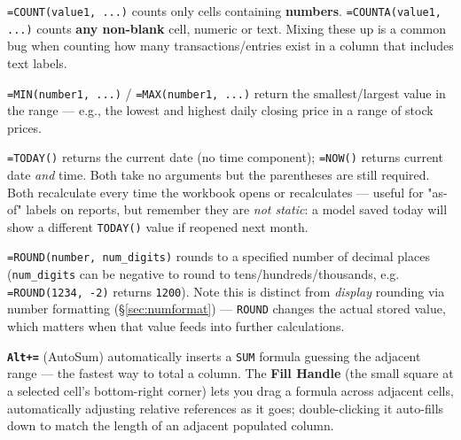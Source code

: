 \documentclass[11pt,a4paper]{article}
\newcommand{\key}[1]{\texttt{\colorbox{black!8}{\textbf{#1}}}}
\begin{document}
\begin{formulasyntax}
\texttt{=COUNT(value1, ...)} counts only cells containing \textbf{numbers}. \texttt{=COUNTA(value1, ...)} counts \textbf{any non-blank} cell, numeric or text. Mixing these up is a common bug when counting how many transactions/entries exist in a column that includes text labels.
\end{formulasyntax}

\begin{formulasyntax}
\texttt{=MIN(number1, ...)} / \texttt{=MAX(number1, ...)} return the smallest/largest value in the range --- e.g., the lowest and highest daily closing price in a range of stock prices.
\end{formulasyntax}

\begin{formulasyntax}
\texttt{=TODAY()} returns the current date (no time component); \texttt{=NOW()} returns current date \emph{and} time. Both take no arguments but the parentheses are still required. Both recalculate every time the workbook opens or recalculates --- useful for "as-of" labels on reports, but remember they are \emph{not static}: a model saved today will show a different \texttt{TODAY()} value if reopened next month.
\end{formulasyntax}

\begin{formulasyntax}[ROUND]
\texttt{=ROUND(number, num\_digits)} rounds to a specified number of decimal places (\texttt{num\_digits} can be negative to round to tens/hundreds/thousands, e.g. \texttt{=ROUND(1234, -2)} returns \texttt{1200}). Note this is distinct from \emph{display} rounding via number formatting (\S\ref{sec:numformat}) --- \texttt{ROUND} changes the actual stored value, which matters when that value feeds into further calculations.
\end{formulasyntax}

\begin{protip}
\key{Alt+=} (AutoSum) automatically inserts a \texttt{SUM} formula guessing the adjacent range --- the fastest way to total a column. The \textbf{Fill Handle} (the small square at a selected cell's bottom-right corner) lets you drag a formula across adjacent cells, automatically adjusting relative references as it goes; double-clicking it auto-fills down to match the length of an adjacent populated column.
\end{protip}
\end{document}
